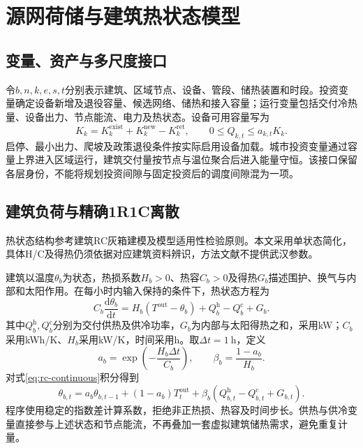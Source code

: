 \section{源网荷储与建筑热状态模型}

\subsection{变量、资产与多尺度接口}

令$b,n,k,e,s,t$分别表示建筑、区域节点、设备、管段、储热装置和时段。投资变量确定设备新增及退役容量、候选网络、储热和接入容量；运行变量包括交付冷热量、设备出力、节点能流、电力及热状态。设备可用容量写为
\begin{equation}
K_k=K_k^{\mathrm{exist}}+K_k^{\mathrm{new}}-K_k^{\mathrm{ret}},\qquad
0\leq Q_{k,t}\leq a_{k,t}K_k.
\label{eq:capacity}
\end{equation}
启停、最小出力、爬坡及政策退役条件按实际启用设备加载。城市投资变量通过容量上界进入区域运行，建筑交付量按节点与温位聚合后进入能量守恒。该接口保留各层身份，不能将规划投资间隙与固定投资后的调度间隙混为一项。

\subsection{建筑负荷与精确1R1C离散}

热状态结构参考建筑RC灰箱建模及模型适用性检验原则。本文采用单状态简化，具体H/C及得热仍须依据对应建筑资料辨识，方法文献不提供武汉参数。

建筑以温度$\theta_b$为状态，热损系数$H_b>0$、热容$C_b>0$及得热$G_b$描述围护、换气与内部和太阳作用。在每小时内输入保持的条件下，热状态方程为
\begin{equation}
C_b\frac{\mathrm d\theta_b}{\mathrm dt}
=H_b(T^{\mathrm{out}}-\theta_b)+Q_b^{\mathrm h}-Q_b^{\mathrm c}+G_b.
\label{eq:rc-continuous}
\end{equation}
其中$Q_b^{\mathrm h},Q_b^{\mathrm c}$分别为交付供热及供冷功率，$G_b$为内部与太阳得热之和，采用kW；$C_b$采用kWh/K、$H_b$采用kW/K，时间采用h。取$\Delta t=1~\mathrm h$，定义
\begin{equation}
a_b=\exp\!\left(-\frac{H_b\Delta t}{C_b}\right),\qquad
\beta_b=\frac{1-a_b}{H_b}.
\label{eq:rc-coefficients}
\end{equation}
对式\eqref{eq:rc-continuous}积分得到
\begin{equation}
\theta_{b,t}=a_b\theta_{b,t-1}+(1-a_b)T_t^{\mathrm{out}}
+\beta_b\left(Q_{b,t}^{\mathrm h}-Q_{b,t}^{\mathrm c}+G_{b,t}\right).
\label{eq:alg-building}
\end{equation}
程序使用稳定的指数差计算系数，拒绝非正热损、热容及时间步长。供热与供冷变量直接参与上述状态和节点能流，不再叠加一套虚拟建筑储热需求，避免重复计量。

